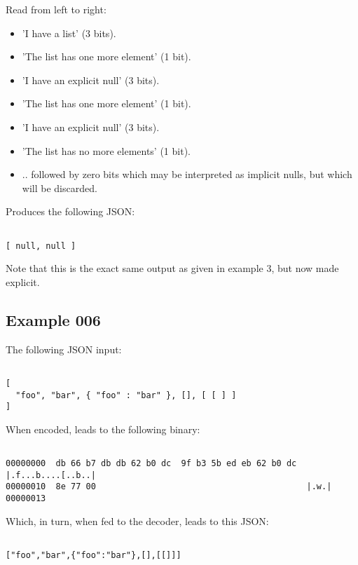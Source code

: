 Read from left to right:
\begin{itemize}
\item 'I have a list' (3 bits).
\item 'The list has one more element' (1 bit).
\item 'I have an explicit null' (3 bits).
\item 'The list has one more element' (1 bit).
\item 'I have an explicit null' (3 bits).
\item 'The list has no more elements' (1 bit).
\item .. followed by zero bits which may be interpreted as implicit
      nulls, but which will be discarded.
\end{itemize}

Produces the following JSON:

\begin{changemargin}{-60mm}{0mm}
\begin{myquote}
\begin{verbatim}

[ null, null ]

\end{verbatim}
\end{myquote}
\end{changemargin}

Note that this is the exact same output as given in example 3, but now
made explicit.

\subsection{Example 006}

The following JSON input:

\begin{changemargin}{-60mm}{0mm}
\begin{myquote}
\begin{verbatim}

[
  "foo", "bar", { "foo" : "bar" }, [], [ [ ] ]
]

\end{verbatim}
\end{myquote}
\end{changemargin}

When encoded, leads to the following binary:

\begin{changemargin}{-60mm}{0mm}
\begin{myquote}
\begin{verbatim}

00000000  db 66 b7 db db 62 b0 dc  9f b3 5b ed eb 62 b0 dc  |.f...b....[..b..|
00000010  8e 77 00                                          |.w.|
00000013

\end{verbatim}
\end{myquote}
\end{changemargin}

Which, in turn, when fed to the decoder, leads to this JSON:

\begin{changemargin}{-60mm}{0mm}
\begin{myquote}
\begin{verbatim}

["foo","bar",{"foo":"bar"},[],[[]]]

\end{verbatim}
\end{myquote}
\end{changemargin}

